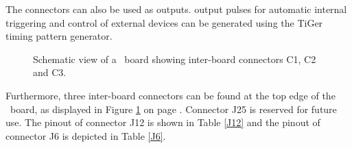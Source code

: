 	
	The connectors can also be used as outputs. 
	 output pulses for automatic internal triggering and control of external devices 
	can be generated using the TiGer timing pattern generator.

		\begin{figure}[ht]
			\begin{center}
				
				\caption{Schematic view of a \deviceName\ board showing inter-board connectors C1, C2 and C3.\label{fig:schematics}}
			\end{center}
		\end{figure}

	Furthermore, three inter-board connectors can be found at the top edge of the \deviceName\ board, 
	as displayed in Figure \ref{fig:schematics} on page \pageref{fig:schematics}. 
	Connector J25 is reserved for future use. The pinout of connector J12 is shown in Table \ref{J12} and the pinout of connector J6 is depicted in Table \ref{J6}.

